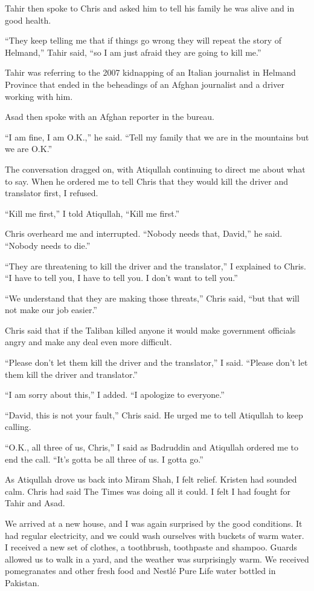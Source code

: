 ﻿\documentclass[12pt]{article}
\begin{document}
Tahir then spoke to Chris and asked him to tell his family he was alive and in good health.

``They keep telling me that if things go wrong they will repeat the story of Helmand,'' Tahir said,
``so I am just afraid they are going to kill me.''

Tahir was referring to the 2007 kidnapping of an Italian journalist in Helmand Province that ended
in the beheadings of an Afghan journalist and a driver working with him.

Asad then spoke with an Afghan reporter in the bureau.

``I am fine, I am O.K.,'' he said. ``Tell my family that we are in the mountains but we are O.K.''

The conversation dragged on, with Atiqullah continuing to direct me about what to say. When he
ordered me to tell Chris that they would kill the driver and translator first, I refused.

``Kill me first,'' I told Atiqullah, ``Kill me first.''

Chris overheard me and interrupted. ``Nobody needs that, David,'' he said. ``Nobody needs to die.''

``They are threatening to kill the driver and the translator,'' I explained to Chris. ``I have to
tell you, I have to tell you. I don't want to tell you.''

``We understand that they are making those threats,'' Chris said, ``but that will not make our job
easier.''

Chris said that if the Taliban killed anyone it would make government officials angry and make any
deal even more difficult.

``Please don't let them kill the driver and the translator,'' I said. ``Please don't let them kill
the driver and translator.''

``I am sorry about this,'' I added. ``I apologize to everyone.''

``David, this is not your fault,'' Chris said. He urged me to tell Atiqullah to keep calling.

``O.K., all three of us, Chris,'' I said as Badruddin and Atiqullah ordered me to end the call.
``It's gotta be all three of us. I gotta go.''

As Atiqullah drove us back into Miram Shah, I felt relief. Kristen had sounded calm. Chris had said
The Times was doing all it could. I felt I had fought for Tahir and Asad.

We arrived at a new house, and I was again surprised by the good conditions. It had regular
electricity, and we could wash ourselves with buckets of warm water. I received a new set of
clothes, a toothbrush, toothpaste and shampoo. Guards allowed us to walk in a yard, and the weather
was surprisingly warm. We received pomegranates and other fresh food and Nestl\'e Pure Life water
bottled in Pakistan.
\end{document}

